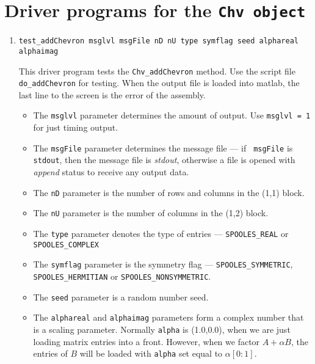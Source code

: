 \par
\section{Driver programs for the {\tt Chv object}}
\label{section:Chv:drivers}
\par
\begin{enumerate}
\item
\begin{verbatim}
test_addChevron msglvl msgFile nD nU type symflag seed alphareal alphaimag
\end{verbatim}
This driver program tests the {\tt Chv\_addChevron} method.
Use the script file {\tt do\_addChevron} for testing.
When the output file is loaded into matlab,
the last line to the screen is the error of the assembly.
\par
\begin{itemize}
\item
The {\tt msglvl} parameter determines the amount of output.
Use {\tt msglvl = 1} for just timing output.
\item
The {\tt msgFile} parameter determines the message file --- if {\tt
msgFile} is {\tt stdout}, then the message file is {\it stdout},
otherwise a file is opened with {\it append} status to receive any
output data.
\item
The {\tt nD} parameter is the number of rows and columns 
in the (1,1) block.
\item
The {\tt nU} parameter is the number of columns 
in the (1,2) block.
\item
The {\tt type} parameter denotes the type of entries ---
{\tt SPOOLES\_REAL} or {\tt SPOOLES\_COMPLEX} 
\item
The {\tt symflag} parameter is the symmetry flag ---
{\tt SPOOLES\_SYMMETRIC}, {\tt SPOOLES\_HERMITIAN}
or {\tt SPOOLES\_NONSYMMETRIC}.
\item
The {\tt seed} parameter is a random number seed.
\item
The {\tt alphareal} and {\tt alphaimag} parameters form a complex
number that is a scaling parameter.
Normally {\tt alpha} is (1.0,0.0), when we are just loading matrix
entries into a front.
However, when we factor $A + \alpha B$, the entries of $B$ will
be loaded with {\tt alpha} set equal to $\alpha[0:1]$.
\end{itemize}

\end{enumerate}
